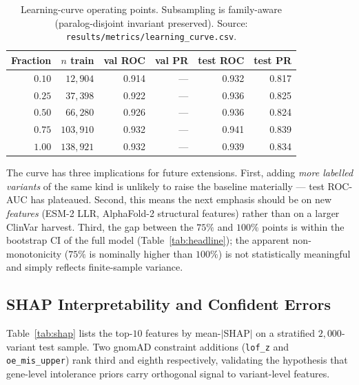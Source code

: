 \documentclass[11pt,a4paper,oneside]{report}
\begin{document}
\begin{table}[H]
\centering
\caption[Learning-curve operating points]{Learning-curve operating
points. Subsampling is family-aware (paralog-disjoint invariant
preserved). Source:
\texttt{results/metrics/learning\_curve.csv}.}
\label{tab:learning-curve}
\small
\begin{tabular}{@{}r r r r r r@{}}
\toprule
\textbf{Fraction} & \textbf{$n$ train} & \textbf{val ROC} &
\textbf{val PR} & \textbf{test ROC} & \textbf{test PR} \\
\midrule
$0.10$ & $12{,}904$  & 0.914 & --- & 0.932 & 0.817 \\
$0.25$ & $37{,}398$  & 0.922 & --- & 0.936 & 0.825 \\
$0.50$ & $66{,}280$  & 0.926 & --- & 0.936 & 0.824 \\
$0.75$ & $103{,}910$ & 0.932 & --- & 0.941 & 0.839 \\
\rowcolor{green!8}
$1.00$ & $138{,}921$ & 0.932 & --- & 0.939 & 0.834 \\
\bottomrule
\end{tabular}
\end{table}

The curve has three implications for future extensions.
First, adding \emph{more labelled variants} of the same kind is
unlikely to raise the baseline materially --- test ROC-AUC has
plateaued. Second, this means the next emphasis should be on new
\emph{features} (ESM-2 LLR, AlphaFold-2 structural features) rather
than on a larger ClinVar harvest. Third, the gap between the
$75\%$ and $100\%$ points is within the bootstrap CI of the full
model (Table~\ref{tab:headline}); the apparent non-monotonicity
($75\%$ is nominally higher than $100\%$) is not statistically
meaningful and simply reflects finite-sample variance.

\subsection{SHAP Interpretability and Confident Errors}
\label{sec:res-shap}

Table~\ref{tab:shap} lists the top-$10$ features
by mean-$|$SHAP$|$ on a stratified $2{,}000$-variant
test sample. Two gnomAD constraint additions
(\texttt{lof\_z} and \texttt{oe\_mis\_upper}) rank
third and eighth respectively, validating the
hypothesis that gene-level intolerance priors carry
orthogonal signal to variant-level features.
\end{document}
